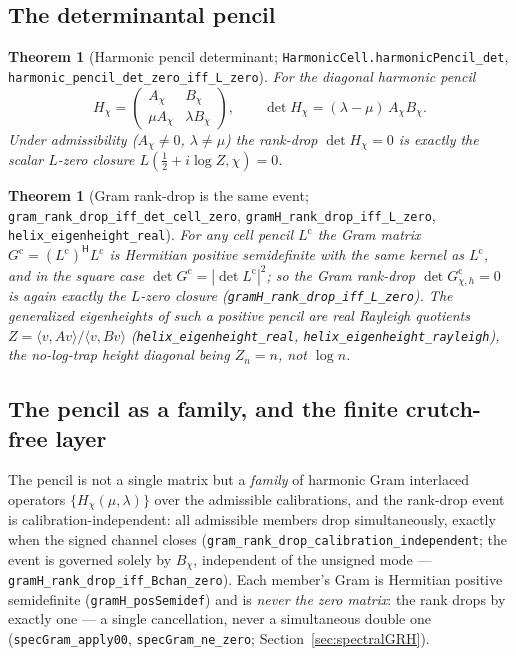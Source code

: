 \documentclass[11pt]{article}
\newtheorem{theorem}[definition]{Theorem}
\newcommand{\code}[1]{\texttt{#1}}
\begin{document}
\subsection{The determinantal pencil}

\begin{theorem}[Harmonic pencil determinant; \code{HarmonicCell.harmonicPencil\_det}, \code{harmonic\_pencil\_det\_zero\_iff\_L\_zero}]\label{thm:pencildet}
For the diagonal harmonic pencil
\[
  H_\chi=\begin{pmatrix} A_\chi & B_\chi\\[2pt] \mu A_\chi & \lambda B_\chi\end{pmatrix},
  \qquad \det H_\chi=(\lambda-\mu)\,A_\chi B_\chi .
\]
Under admissibility ($A_\chi\neq0$, $\lambda\neq\mu$) the rank-drop $\det H_\chi=0$ is exactly the
scalar $L$-zero closure $L(\tfrac12+i\log Z,\chi)=0$.
\end{theorem}

\begin{theorem}[Gram rank-drop is the same event; \code{gram\_rank\_drop\_iff\_det\_cell\_zero}, \code{gramH\_rank\_drop\_iff\_L\_zero}, \code{helix\_eigenheight\_real}]\label{thm:gram}
For any cell pencil $L^{\mathrm c}$ the Gram matrix $G^{\mathrm c}=(L^{\mathrm c})^{\mathsf H}L^{\mathrm c}$
is Hermitian positive semidefinite with the same kernel as $L^{\mathrm c}$, and in the square case
$\det G^{\mathrm c}=|\det L^{\mathrm c}|^2$; so the Gram rank-drop $\det G^{\mathrm c}_{\chi,h}=0$ is
again exactly the $L$-zero closure (\code{gramH\_rank\_drop\_iff\_L\_zero}). The generalized
eigenheights of such a positive pencil are real Rayleigh quotients
$Z=\langle v,Av\rangle/\langle v,Bv\rangle$ (\code{helix\_eigenheight\_real},
\code{helix\_eigenheight\_rayleigh}), the no-log-trap height diagonal being $Z_n=n$, not $\log n$.
\end{theorem}

\subsection{The pencil as a family, and the finite crutch-free layer}\label{sub:pencilfamily}

The pencil is not a single matrix but a \emph{family} of harmonic Gram interlaced operators
$\{H_\chi(\mu,\lambda)\}$ over the admissible calibrations, and the rank-drop event is
calibration-independent: all admissible members drop simultaneously, exactly when the signed
channel closes (\code{gram\_rank\_drop\_calibration\_independent}; the event is governed solely by
$B_\chi$, independent of the unsigned mode --- \code{gramH\_rank\_drop\_iff\_Bchan\_zero}).  Each member's Gram is
Hermitian positive semidefinite (\code{gramH\_posSemidef}) and is \emph{never the zero matrix}: the
rank drops by exactly one --- a single cancellation, never a simultaneous double one
(\code{specGram\_apply00}, \code{specGram\_ne\_zero}; Section~\ref{sec:spectralGRH}).
\end{document}
